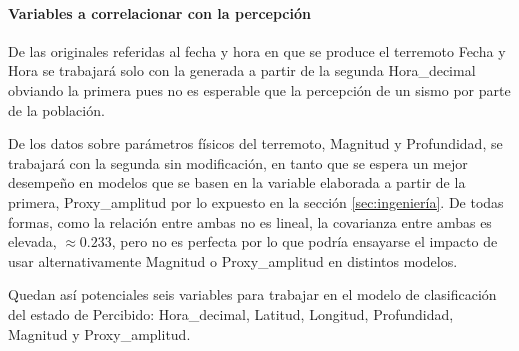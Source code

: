 \documentclass[a4paper]{report}
\begin{document}



\paragraph{Variables a correlacionar con la percepción}
De las originales referidas al fecha y hora en que se produce el terremoto Fecha y Hora se trabajará solo con la generada a partir de la segunda Hora\_decimal obviando la primera pues no es esperable que la percepción de un sismo por parte de la población.

De los datos sobre parámetros físicos del terremoto, Magnitud y Profundidad, se trabajará con la segunda sin modificación, en tanto que se espera un mejor desempeño en modelos que se basen en la variable elaborada a partir de la primera, Proxy\_amplitud por lo expuesto en la sección \ref{sec:ingeniería}.
De todas formas, como la relación entre ambas no es lineal, la covarianza entre ambas es elevada, \(\approx 0.233\), pero no es perfecta por lo que podría ensayarse el impacto de usar alternativamente Magnitud o Proxy\_amplitud en distintos modelos.

Quedan así potenciales seis variables para trabajar en el modelo de clasificación del estado de Percibido: Hora\_decimal, Latitud, Longitud, Profundidad, Magnitud y Proxy\_amplitud.
\end{document}
